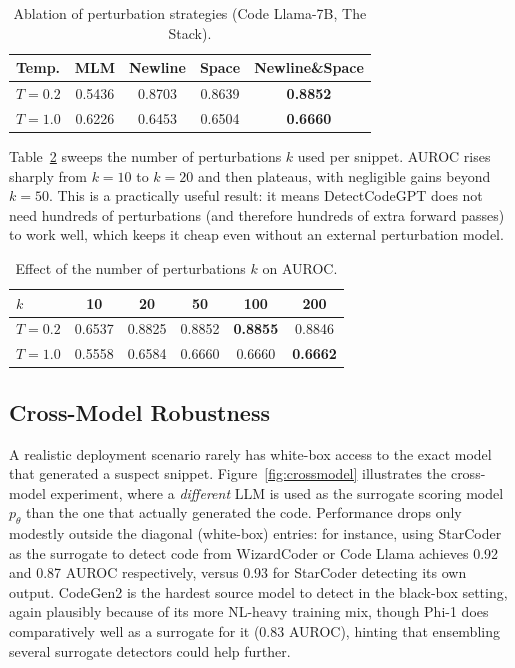 \documentclass[manuscript,review]{acmart}
\begin{document}
\begin{table}[t]
\caption{Ablation of perturbation strategies (Code Llama-7B, The Stack).}
\label{tab:ablation}
\begin{tabular}{@{}lcccc@{}}
\toprule
\textbf{Temp.} & \textbf{MLM} & \textbf{Newline} & \textbf{Space} & \textbf{Newline\&Space} \\
\midrule
$T=0.2$ & 0.5436 & 0.8703 & 0.8639 & \textbf{0.8852} \\
$T=1.0$ & 0.6226 & 0.6453 & 0.6504 & \textbf{0.6660} \\
\bottomrule
\end{tabular}
\end{table}

Table~\ref{tab:perturbcount} sweeps the number of perturbations $k$ used per snippet. AUROC rises sharply from $k=10$ to $k=20$ and then plateaus, with negligible gains beyond $k=50$. This is a practically useful result: it means DetectCodeGPT does not need hundreds of perturbations (and therefore hundreds of extra forward passes) to work well, which keeps it cheap even without an external perturbation model.

\begin{table}[t]
\caption{Effect of the number of perturbations $k$ on AUROC.}
\label{tab:perturbcount}
\begin{tabular}{@{}lccccc@{}}
\toprule
$k$ & 10 & 20 & 50 & 100 & 200 \\
\midrule
$T=0.2$ & 0.6537 & 0.8825 & 0.8852 & \textbf{0.8855} & 0.8846 \\
$T=1.0$ & 0.5558 & 0.6584 & 0.6660 & 0.6660 & \textbf{0.6662} \\
\bottomrule
\end{tabular}
\end{table}

\subsection{Cross-Model Robustness}
A realistic deployment scenario rarely has white-box access to the exact model that generated a suspect snippet. Figure~\ref{fig:crossmodel} illustrates the cross-model experiment, where a \emph{different} LLM is used as the surrogate scoring model $p_\theta$ than the one that actually generated the code. Performance drops only modestly outside the diagonal (white-box) entries: for instance, using StarCoder as the surrogate to detect code from WizardCoder or Code Llama achieves 0.92 and 0.87 AUROC respectively, versus 0.93 for StarCoder detecting its own output. CodeGen2 is the hardest source model to detect in the black-box setting, again plausibly because of its more NL-heavy training mix, though Phi-1 does comparatively well as a surrogate for it (0.83 AUROC), hinting that ensembling several surrogate detectors could help further.
\end{document}
